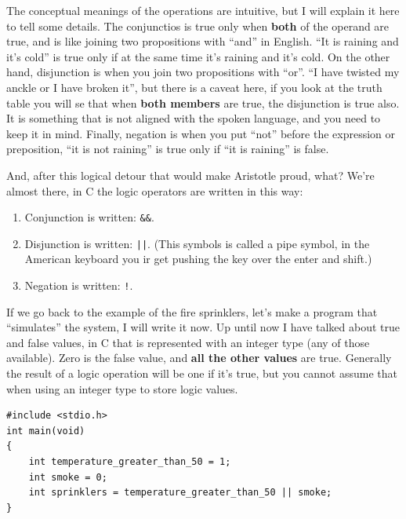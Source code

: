 \documentclass[a4paper]{article}
\begin{document}
The conceptual meanings of the operations are intuitive, but I will explain it
here to tell some details. The conjunctios is true only when \textbf{both}
of the operand are true, and is like joining two propositions with ``and'' in
English. ``It is raining and it's cold'' is true only if at the same time it's
raining and it's cold. On the other hand, disjunction is when you join two
propositions with ``or''. ``I have twisted my anckle or I have broken it'', but
there is a caveat here, if you look at the truth table you will se that when
\textbf{both members}  are true, the disjunction is true also. It is something
that is not aligned with the spoken language, and you need to keep it in mind.
Finally, negation is when you put ``not'' before the expression or preposition,
``it is not raining'' is true only if ``it is raining'' is false.

And, after this logical detour that would make Aristotle proud, what?
We're almost there, in C the logic operators are written in this way:
\begin{enumerate}
    \item Conjunction is written: \verb!&&!.
    \item Disjunction is written: \verb!||!. (This symbols is called a pipe
    symbol, in the American keyboard you ir get pushing the key over the enter
    and shift.)
    \item Negation is written: \verb"!".
\end{enumerate}

If we go back to the example of the fire sprinklers, let's make a program that
``simulates'' the system, I will write it now.
Up until now I have talked about true and false values, in C that is represented
with an integer type (any of those available). Zero is the false value, and
\textbf{all the other values} are true. Generally the result of a logic
operation will be one if it's true, but you cannot assume that when using
an integer type to store logic values.

\noindent
\begin{minipage}[H]{\linewidth}
\mbox{}
\begin{lstlisting}[style=C,
caption={First program with logic operations},
label={lst:firstLogicProgram}]
#include <stdio.h>
int main(void)
{
    int temperature_greater_than_50 = 1;
    int smoke = 0;
    int sprinklers = temperature_greater_than_50 || smoke;
}
\end{lstlisting}
\end{minipage}
\end{document}
